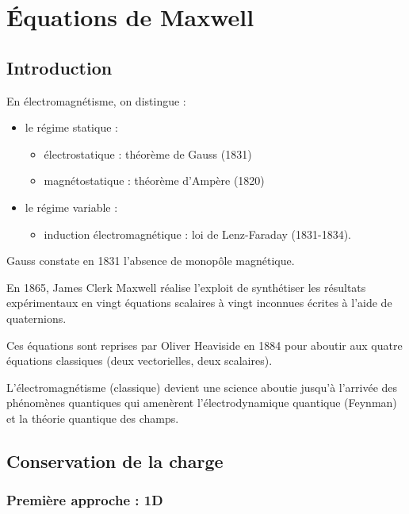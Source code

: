 \chapter{Équations de Maxwell}

\minitoc

\section*{Introduction}

En électromagnétisme, on distingue :

\begin{itemize}
    \item le régime statique : \begin{itemize}
        \item électrostatique : théorème de Gauss (1831)
        \item magnétostatique : théorème d'Ampère (1820) \\
    \end{itemize}
    \item le régime variable : \begin{itemize}
        \item induction électromagnétique : loi de Lenz-Faraday (1831-1834).
    \end{itemize}
\end{itemize}

Gauss constate en 1831 l'absence de monopôle magnétique.

En 1865, James Clerk Maxwell réalise l'exploit de synthétiser les résultats expérimentaux en vingt équations scalaires à vingt inconnues écrites à l'aide de quaternions.

Ces équations sont reprises par Oliver Heaviside en 1884 pour aboutir aux quatre équations classiques (deux vectorielles, deux scalaires).

L'électromagnétisme (classique) devient une science aboutie jusqu'à l'arrivée des phénomènes quantiques qui amenèrent l'électrodynamique quantique (Feynman) et la théorie quantique des champs.

\section{Conservation de la charge}

\subsection{Première approche : 1D}

